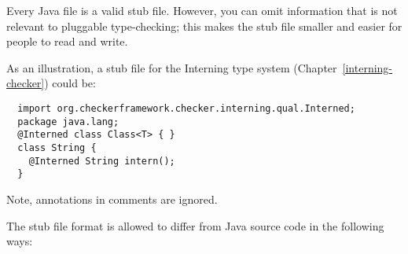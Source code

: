 Every Java file is a valid stub file.  However, you can omit information
that is not relevant to pluggable type-checking; this makes the stub file
smaller and easier for people to read and write.

As an illustration, a stub file for the Interning type system
(Chapter~\ref{interning-checker}) could be:

\begin{Verbatim}
  import org.checkerframework.checker.interning.qual.Interned;
  package java.lang;
  @Interned class Class<T> { }
  class String {
    @Interned String intern();
  }
\end{Verbatim}

Note, annotations in comments are ignored.

The stub file format is allowed to differ from Java source code in the
following ways:
